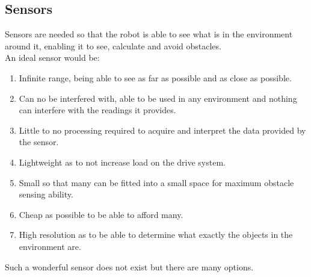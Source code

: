 \subsection{Sensors}
Sensors are needed so that the robot is able to see what is in the environment around it, enabling it to see, calculate and avoid obstacles.
\\An ideal sensor would be:
\begin{enumerate}
\item Infinite range, being able to see as far as possible and as close as possible.
\item Can no be interfered with, able to be used in any environment and nothing can interfere with the readings it provides.
\item Little to no processing required to acquire and interpret the data provided by the sensor.
\item Lightweight as to not increase load on the drive system.
\item Small so that many can be fitted into a small space for maximum obstacle sensing ability.
\item Cheap as possible to be able to afford many.
\item High resolution as to be able to determine what exactly the objects in the environment are.
\end{enumerate}
Such a wonderful sensor does not exist but there are many options.

